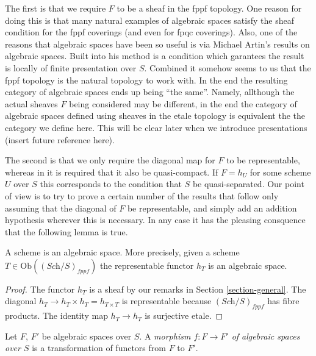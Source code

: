 \medskip\noindent
The first is that we require $F$ to be a sheaf in the fppf topology.
One reason for doing this is that many natural examples
of algebraic spaces satisfy the sheaf condition for the fppf coverings
(and even for fpqc coverings). Also, one of the reasons that algebraic
spaces have been so useful is via Michael Artin's results on algebraic spaces.
Built into his method is a condition which garantees the result is
locally of finite presentation over $S$.
Combined it somehow seems to us that the fppf topology
is the natural topology to work with. In the end the resulting category
of algebraic spaces ends up being ``the same''. Namely, allthough the actual
sheaves $F$ being considered may be different, in the end the
category of algebraic spaces defined using sheaves in the etale topology
is equivalent the the category we define here. This will be clear later
when we introduce presentations (insert future reference here).

\medskip\noindent
The second is that we only require the diagonal map for $F$ to be
representable, whereas in \cite{Kn} it is required that it also
be quasi-compact. If $F = h_U$ for some scheme $U$ over $S$
this corresponds to the condition that $S$ be quasi-separated.
Our point of view is to try to prove a certain
number of the results that follow only assuming that the diagonal
of $F$ be representable, and simply add an addition hypothesis wherever
this is necessary. In any case it has the pleasing consquence that
the following lemma is true.

\begin{lemma}
\label{lemma-scheme-is-space}
A scheme is an algebraic space. More precisely,
given a scheme $T \in \text{Ob}((\textit{Sch}/S)_{fppf})$
the representable functor $h_T$ is an algebraic space.
\end{lemma}

\begin{proof}
The functor $h_T$ is a sheaf by our remarks in Section \ref{section-general}.
The diagonal $h_T \to h_T \times h_T = h_{T \times T}$ is
representable because $(\textit{Sch}/S)_{fppf}$ has fibre products.
The identity map $h_T \to h_T$ is surjective etale.
\end{proof}

\begin{definition}
\label{definition-morphism-algebraic-spaces}
Let $F$, $F'$ be algebraic spaces over $S$.
A {\it morphism $f : F \to F'$ of algebraic spaces over $S$}
is a transformation of functors from $F$ to $F'$.
\end{definition}

